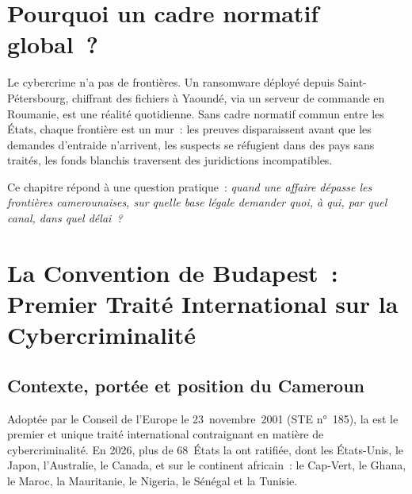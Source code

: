 \section*{Pourquoi un cadre normatif global~?}

Le cybercrime n'a pas de frontières. Un ransomware déployé depuis
Saint-Pétersbourg, chiffrant des fichiers à Yaoundé, via un serveur de
commande en Roumanie, est une réalité quotidienne. Sans cadre normatif
commun entre les États, chaque frontière est un mur~: les preuves
disparaissent avant que les demandes d'entraide n'arrivent, les suspects
se réfugient dans des pays sans traités, les fonds blanchis traversent
des juridictions incompatibles.

Ce chapitre répond à une question pratique~: \emph{quand une affaire
dépasse les frontières camerounaises, sur quelle base légale demander
quoi, à qui, par quel canal, dans quel délai~?}

\separateur

\section{La Convention de Budapest~: Premier Traité International
sur la Cybercriminalité}
\label{sec:budapest}

\subsection{Contexte, portée et position du Cameroun}

Adoptée par le Conseil de l'Europe le 23~novembre~2001 (STE n°~185),
la  est
le premier et unique traité international contraignant en matière de
cybercriminalité. En 2026, plus de 68~États la ont ratifiée, dont les
États-Unis, le Japon, l'Australie, le Canada, et sur le continent
africain~: le Cap-Vert, le Ghana, le Maroc, la Mauritanie, le Nigeria,
le Sénégal et la Tunisie.

